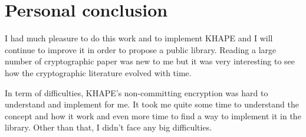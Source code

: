 \documentclass[../report.tex]{subfiles}
\begin{document}
\section{Personal conclusion}
I had much pleasure to do this work and to implement KHAPE and I will continue to improve it in order to propose a public library. Reading a large number of cryptographic paper was new to me but it was very interesting to see how the cryptographic literature evolved with time.

In term of difficulties, KHAPE's non-committing encryption was hard to understand and implement for me. It took me quite some time to understand the concept and how it work and even more time to find a way to implement it in the library.
Other than that, I didn't face any big difficulties.

\end{document}
